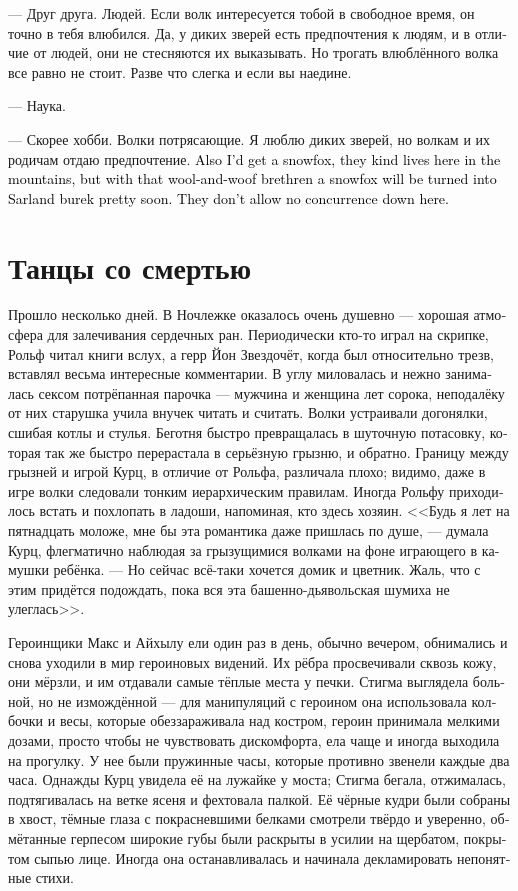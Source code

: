 \documentclass[a4paper,12pt,fleqn]{book}\usepackage{cooltooltips}\usepackage{polyglossia}\setdefaultlanguage[babelshorthands=true]{russian}\setotherlanguage{english}\defaultfontfeatures{Ligatures=TeX,Mapping=tex-text} \usepackage{xcolor}\definecolor{lightgray}{HTML}{bbbbbb}\color{lightgray}\newcommand{\ml}[3]{\textenglish{\textcolor{black}{#3}}}
\begin{document}
--- Друг друга.
Людей.
Если волк интересуется тобой в свободное время, он точно в тебя влюбился.
Да, у диких зверей есть предпочтения к людям, и в отличие от людей, они не стесняются их выказывать.
Но трогать влюблённого волка все равно не стоит.
Разве что слегка и если вы наедине.

--- Наука.

--- Скорее хобби.
Волки потрясающие.
Я люблю диких зверей, но волкам и их родичам отдаю предпочтение.
\ml{$0$}
{Хотел бы ещё завести песца, тут в горах они водятся, но с этой шерстяной братией песец быстро превратится в сарландский бурек.}
{Also I'd get a snowfox, they kind lives here in the mountains, but with that wool-and-woof brethren a snowfox will be turned into Sarland burek pretty soon.}
\ml{$0$}
{Конкуренции они не терпят.}
{They don't allow no concurrence down here.}

\section{Танцы со смертью}

Прошло несколько дней.
В Ночлежке оказалось очень душевно --- хорошая атмосфера для залечивания сердечных ран.
Периодически кто-то играл на скрипке, Рольф читал книги вслух, а герр Йон Звездочёт, когда был относительно трезв, вставлял весьма интересные комментарии.
В углу миловалась и нежно занималась сексом потрёпанная парочка --- мужчина и женщина лет сорока, неподалёку от них старушка учила внучек читать и считать.
Волки устраивали догонялки, сшибая котлы и стулья.
Беготня быстро превращалась в шуточную потасовку, которая так же быстро перерастала в серьёзную грызню, и обратно.
Границу между грызней и игрой Курц, в отличие от Рольфа, различала плохо;
видимо, даже в игре волки следовали тонким иерархическим правилам.
Иногда Рольфу приходилось встать и похлопать в ладоши, напоминая, кто здесь хозяин.
<<Будь я лет на пятнадцать моложе, мне бы эта романтика даже пришлась по душе, --- думала Курц, флегматично наблюдая за грызущимися волками на фоне играющего в камушки ребёнка.
--- Но сейчас всё-таки хочется домик и цветник.
Жаль, что с этим придётся подождать, пока вся эта башенно-дьявольская шумиха не улеглась>>.

Героинщики Макс и Айхылу ели один раз в день, обычно вечером, обнимались и снова уходили в мир героиновых видений.
Их рёбра просвечивали сквозь кожу, они мёрзли, и им отдавали самые тёплые места у печки.
Стигма выглядела больной, но не измождённой --- для манипуляций с героином она использовала колбочки и весы, которые обеззараживала над костром, героин принимала мелкими дозами, просто чтобы не чувствовать дискомфорта, ела чаще и иногда выходила на прогулку.
У нее были пружинные часы, которые противно звенели каждые два часа.
Однажды Курц увидела её на лужайке у моста;
Стигма бегала, отжималась, подтягивалась на ветке ясеня и фехтовала палкой.
Её чёрные кудри были собраны в хвост, тёмные глаза с покрасневшими белками смотрели твёрдо и уверенно, обмётанные герпесом широкие губы были раскрыты в усилии на щербатом, покрытом сыпью лице.
Иногда она останавливалась и начинала декламировать непонятные стихи.
\end{document}
